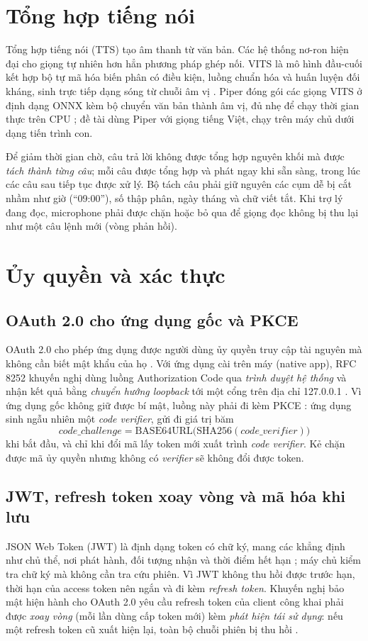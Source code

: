 \section{Tổng hợp tiếng nói}
Tổng hợp tiếng nói (TTS) tạo âm thanh từ văn bản. Các hệ thống nơ-ron hiện đại cho giọng tự nhiên hơn hẳn phương pháp ghép nối. VITS là mô hình đầu-cuối kết hợp bộ tự mã hóa biến phân có điều kiện, luồng chuẩn hóa và huấn luyện đối kháng, sinh trực tiếp dạng sóng từ chuỗi âm vị \cite{vits}. Piper đóng gói các giọng VITS ở định dạng ONNX kèm bộ chuyển văn bản thành âm vị, đủ nhẹ để chạy thời gian thực trên CPU \cite{piper}; đề tài dùng Piper với giọng tiếng Việt, chạy trên máy chủ dưới dạng tiến trình con.

Để giảm thời gian chờ, câu trả lời không được tổng hợp nguyên khối mà được \textit{tách thành từng câu}; mỗi câu được tổng hợp và phát ngay khi sẵn sàng, trong lúc các câu sau tiếp tục được xử lý. Bộ tách câu phải giữ nguyên các cụm dễ bị cắt nhầm như giờ (“09:00”), số thập phân, ngày tháng và chữ viết tắt. Khi trợ lý đang đọc, microphone phải được chặn hoặc bỏ qua để giọng đọc không bị thu lại như một câu lệnh mới (vòng phản hồi).

\section{Ủy quyền và xác thực}
\subsection{OAuth 2.0 cho ứng dụng gốc và PKCE}
OAuth 2.0 cho phép ứng dụng được người dùng ủy quyền truy cập tài nguyên mà không cần biết mật khẩu của họ \cite{rfc6749}. Với ứng dụng cài trên máy (native app), RFC 8252 khuyến nghị dùng luồng Authorization Code qua \textit{trình duyệt hệ thống} và nhận kết quả bằng \textit{chuyển hướng loopback} tới một cổng trên địa chỉ 127.0.0.1 \cite{rfc8252,goauthnative}. Vì ứng dụng gốc không giữ được bí mật, luồng này phải đi kèm PKCE \cite{rfc7636}: ứng dụng sinh ngẫu nhiên một \textit{code verifier}, gửi đi giá trị băm
\begin{equation}
  \textit{code\_challenge} = \mathrm{BASE64URL}\bigl(\mathrm{SHA256}(\textit{code\_verifier})\bigr)
\end{equation}
khi bắt đầu, và chỉ khi đổi mã lấy token mới xuất trình \textit{code verifier}. Kẻ chặn được mã ủy quyền nhưng không có \textit{verifier} sẽ không đổi được token.

\subsection{JWT, refresh token xoay vòng và mã hóa khi lưu}
JSON Web Token (JWT) là định dạng token có chữ ký, mang các khẳng định như chủ thể, nơi phát hành, đối tượng nhận và thời điểm hết hạn \cite{rfc7519}; máy chủ kiểm tra chữ ký mà không cần tra cứu phiên. Vì JWT không thu hồi được trước hạn, thời hạn của access token nên ngắn và đi kèm \textit{refresh token}. Khuyến nghị bảo mật hiện hành cho OAuth 2.0 yêu cầu refresh token của client công khai phải được \textit{xoay vòng} (mỗi lần dùng cấp token mới) kèm \textit{phát hiện tái sử dụng}: nếu một refresh token cũ xuất hiện lại, toàn bộ chuỗi phiên bị thu hồi \cite{rfc9700}.

